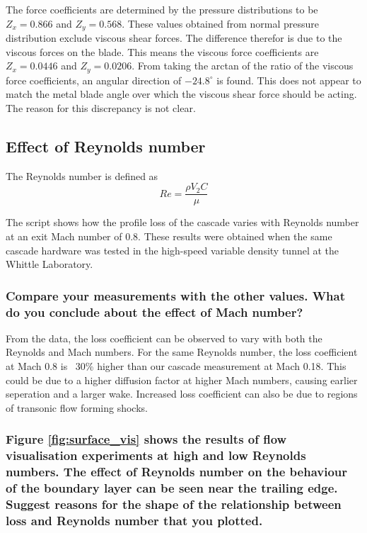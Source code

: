 \documentclass{article}
\begin{document}
The force coefficients are determined by the pressure distributions to be $Z_x = 0.866$ and $Z_y = 0.568$.
These values obtained from normal pressure distribution exclude viscous shear forces.
The difference therefor is due to the viscous forces on the blade.
This means the viscous force coefficients are $Z_x = 0.0446$ and $Z_y = 0.0206$.
From taking the arctan of the ratio of the viscous force coefficients, an angular direction of $-24.8^\circ$ is found.
This does not appear to match the metal blade angle over which the viscous shear force should be acting.
The reason for this discrepancy is not clear.

\subsection{Effect of Reynolds number}

The Reynolds number is defined as
\begin{equation}
    Re = \frac{\rho V_2 C}{\mu}
\end{equation}

The script shows how the profile loss of the cascade varies with Reynolds number at an exit
Mach number of 0.8. These results were obtained when the same cascade hardware was tested
in the high-speed variable density tunnel at the Whittle Laboratory.

\subsubsection{Compare your measurements with the other values. What do you conclude about the
effect of Mach number?}

From the data, the loss coefficient can be observed to vary with both the Reynolds and Mach numbers.
For the same Reynolds number, the loss coefficient at Mach 0.8 is ~30\% higher than our cascade measurement at Mach 0.18.
This could be due to a higher diffusion factor at higher Mach numbers, causing earlier seperation and a larger wake.
Increased loss coefficient can also be due to regions of transonic flow forming shocks.

\subsubsection{Figure \ref{fig:surface_vis} shows the results of flow visualisation experiments at high and low Reynolds
numbers. The effect of Reynolds number on the behaviour of the boundary layer can be seen
near the trailing edge. Suggest reasons for the shape of the relationship between loss and
Reynolds number that you plotted.}
\end{document}
